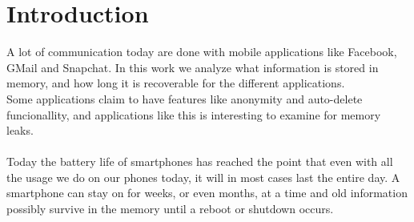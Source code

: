 \section{Introduction}
A lot of communication today are done with mobile applications like Facebook, GMail and Snapchat. In this work we analyze what information is stored in memory, and how long it is recoverable for the different applications. \\
Some applications claim to have features like anonymity and auto-delete funcionallity, and applications like this is interesting to examine for memory leaks. \\ \\
Today the battery life of smartphones has reached the point that even with all the usage we do on our phones today, it will in most cases last the entire day. A smartphone can stay on for weeks, or even months, at a time and old information possibly survive in the memory until a reboot or shutdown occurs.